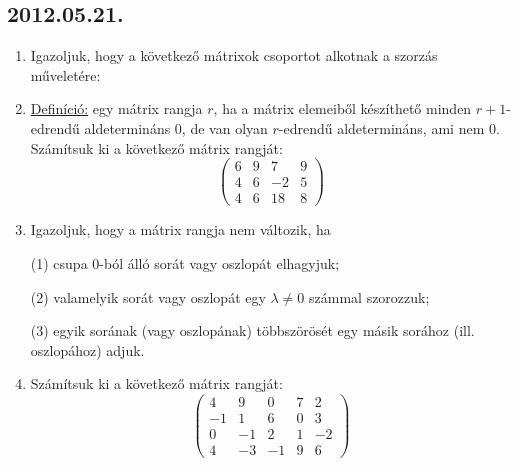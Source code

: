 \subsection*{2012.05.21.}
\begin{enumerate}
\item Igazoljuk, hogy a következő mátrixok csoportot alkotnak a szorzás műveletére:
\item \underline{Definíció:} egy mátrix rangja $r$, ha a mátrix elemeiből készíthető minden $r+1$-edrendű aldetermináns 0, de van olyan $r$-edrendű aldetermináns, ami nem 0. Számítsuk ki a következő mátrix rangját:
$$\begin{pmatrix}
6&9&7&9\\
4&6&-2&5\\
4&6&18&8
\end{pmatrix}$$
\item Igazoljuk, hogy a mátrix rangja nem változik, ha

(1) csupa 0-ból álló sorát vagy oszlopát elhagyjuk;

(2) valamelyik sorát vagy oszlopát egy $\lambda\ne 0$ számmal szorozzuk;

(3) egyik sorának (vagy oszlopának) többszörösét egy másik sorához (ill. oszlopához) adjuk.
\item Számítsuk ki a következő mátrix rangját:
$$
\begin{pmatrix}
4&9&0&7&2\\
-1&1&6&0&3\\
0&-1&2&1&-2\\
4&-3&-1&9&6
\end{pmatrix}
$$
\end{enumerate}


